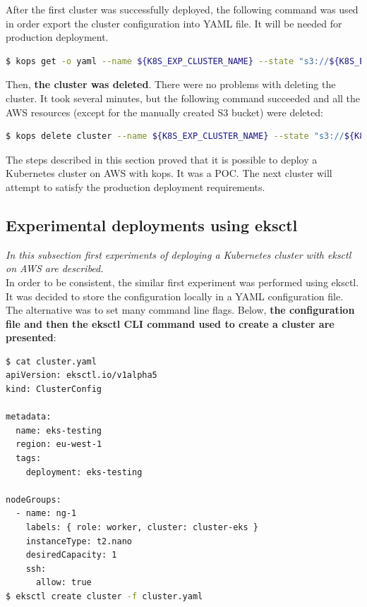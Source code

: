 After the first cluster was successfully deployed, the following command was used in order export the cluster configuration into YAML file. It will be needed for production deployment.
\begin{lstlisting}[basicstyle=\tiny,caption={Command used to export a Kubernetes cluster configuration},captionpos=b,language=Bash,xleftmargin=1cm]
$ kops get -o yaml --name ${K8S_EXP_CLUSTER_NAME} --state "s3://${K8S_EXP_KOPS_S3_BUCKET}"
\end{lstlisting}

Then, \textbf{the cluster was deleted}. There were no problems with deleting the cluster. It took several minutes, but the following command succeeded and all the AWS resources (except for the manually created S3 bucket) were deleted:

\begin{lstlisting}[basicstyle=\tiny,caption={Command used to delete a Kubernetes cluster created with Kops},captionpos=b,language=Bash,xleftmargin=1cm]
$ kops delete cluster --name ${K8S_EXP_CLUSTER_NAME} --state "s3://${K8S_EXP_KOPS_S3_BUCKET}" --yes
\end{lstlisting}

The steps described in this section proved that it is possible to deploy a Kubernetes cluster on AWS with kops. It was a POC. The next cluster will attempt to satisfy the production deployment requirements.

\subsection{Experimental deployments using eksctl}
\textit{In this subsection first experiments of deploying a Kubernetes cluster with eksctl on AWS are described.}
\\

In order to be consistent, the similar first experiment was performed using eksctl. It was decided to store the configuration locally in a YAML configuration file. The alternative was to set many command line flags. Below, \textbf{the configuration file and then the eksctl CLI command used to create a cluster are presented}:
\begin{lstlisting}[basicstyle=\tiny,caption={Commands used to create a cluster with eksctl, without prerequisite steps performed},captionpos=b,language=Bash,xleftmargin=1cm]
$ cat cluster.yaml
apiVersion: eksctl.io/v1alpha5
kind: ClusterConfig

metadata:
  name: eks-testing
  region: eu-west-1
  tags:
    deployment: eks-testing

nodeGroups:
  - name: ng-1
    labels: { role: worker, cluster: cluster-eks }
    instanceType: t2.nano
    desiredCapacity: 1
    ssh:
      allow: true
$ eksctl create cluster -f cluster.yaml
\end{lstlisting}


